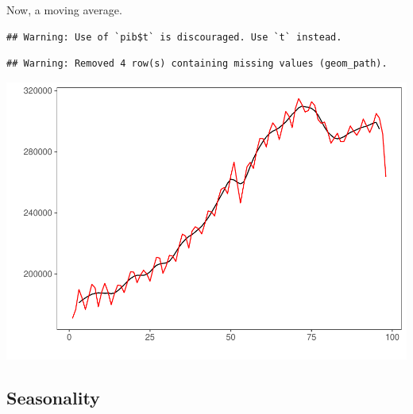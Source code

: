 \documentclass[
]{article}
\newenvironment{Shaded}{\begin{snugshade}}{\end{snugshade}}
\newcommand{\DataTypeTok}[1]{\textcolor[rgb]{0.13,0.29,0.53}{#1}}
\newcommand{\DecValTok}[1]{\textcolor[rgb]{0.00,0.00,0.81}{#1}}
\newcommand{\KeywordTok}[1]{\textcolor[rgb]{0.13,0.29,0.53}{\textbf{#1}}}
\newcommand{\NormalTok}[1]{#1}
\newcommand{\OperatorTok}[1]{\textcolor[rgb]{0.81,0.36,0.00}{\textbf{#1}}}
\newcommand{\StringTok}[1]{\textcolor[rgb]{0.31,0.60,0.02}{#1}}
\begin{document}
Now, a moving average.

\begin{Shaded}
\end{Shaded}

\begin{verbatim}
## Warning: Use of `pib$t` is discouraged. Use `t` instead.
\end{verbatim}

\begin{verbatim}
## Warning: Removed 4 row(s) containing missing values (geom_path).
\end{verbatim}

\begin{center}\includegraphics{Econo2_P5_files/figure-latex/moving average-1} \end{center}

\subsection{Seasonality}
\end{document}
